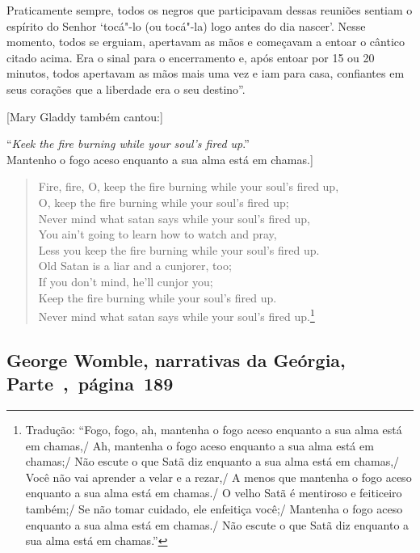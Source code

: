 Praticamente sempre, todos os negros que participavam dessas reuniões
sentiam o espírito do Senhor `tocá"-lo (ou tocá"-la) logo antes do dia
nascer'. Nesse momento, todos se erguiam, apertavam as mãos e começavam
a entoar o cântico citado acima. Era o sinal para o encerramento e, após
entoar por 15 ou 20 minutos, todos apertavam as mãos mais uma vez e iam
para casa, confiantes em seus corações que a liberdade era o seu
destino''.

{[}Mary Gladdy também cantou:{]}

\noindent{}``\emph{Keek the fire burning while your soul's fired up}.''\\
\noindent{}{[}Mantenho o fogo aceso enquanto a sua alma está em chamas.{]}

\begin{verse}
Fire, fire, O, keep the fire burning while your \qb{}soul's fired up,\\
O, keep the fire burning while your soul's \qb{}fired up;\\
Never mind what satan says while your \qb{}soul's fired up,\\
You ain't going to learn how to watch and \qb{}pray,\\
Less you keep the fire burning while your \qb{}soul's fired up.\\
Old Satan is a liar and a cunjorer, too;\\
If you don't mind, he'll cunjor you;\\
Keep the fire burning while your soul's fired \qb{}up.\\ 
Never mind what satan says while your \qb{}soul's fired up.\footnote{Tradução: ``Fogo, fogo, ah, mantenha o fogo aceso enquanto a sua alma está em
chamas,/ Ah, mantenha o
fogo aceso enquanto a sua alma está em chamas;/ Não escute o
que Satã diz enquanto a sua alma está em chamas,/ Você não vai aprender
a velar e a rezar,/ A menos
que mantenha o fogo aceso enquanto a sua alma está em chamas./ O velho Satã é mentiroso e
feiticeiro também;/ Se não tomar cuidado, ele
enfeitiça você;/ Mantenha o fogo
aceso enquanto a sua alma está em chamas./ Não escute o
que Satã diz enquanto a sua alma está em chamas.''}
\end{verse}

\subsection{George Womble, narrativas da Geórgia, Parte~,~página~189}
\label{ref309}

